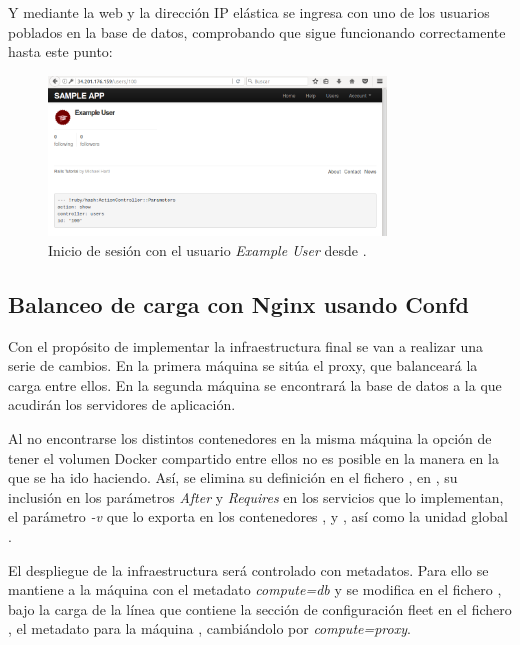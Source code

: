 Y mediante la web y la dirección IP elástica se ingresa con uno de los usuarios poblados en la base de datos, comprobando que sigue funcionando correctamente hasta este punto:

\begin{figure}[H]
\centering
\includegraphics[width=0.8\textwidth]{images/figures/skydns-web.png}
\caption{Inicio de sesión con el usuario \textit{Example User} desde .}
\end{figure}

\subsection{Balanceo de carga con Nginx usando Confd}

Con el propósito de implementar la infraestructura final se van a realizar una serie de cambios. En la primera máquina se sitúa el proxy, que balanceará la carga entre ellos. En la segunda máquina se encontrará la base de datos a la que acudirán los servidores de aplicación.

Al no encontrarse los distintos contenedores en la misma máquina la opción de tener el volumen Docker  compartido entre ellos no es posible en la manera en la que se ha ido haciendo. Así, se elimina su definición en el fichero , en , su inclusión en los parámetros \textit{After} y \textit{Requires} en los servicios que lo implementan, el parámetro \textit{-v} que lo exporta en los contenedores ,  y , así como la unidad global .

El despliegue de la infraestructura será controlado con metadatos. Para ello se mantiene a la máquina  con el metadato \textit{compute=db} y se modifica en el fichero , bajo la carga de la línea que contiene la sección de configuración fleet en el fichero , el metadato para la máquina , cambiándolo por \textit{compute=proxy}.

